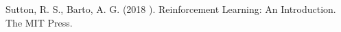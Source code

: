\documentclass[conference]{IEEEtran}
\begin{document}







\begin{thebibliography}{00}
 Sutton, R. S., Barto, A. G. (2018 ). Reinforcement Learning: An Introduction. The MIT Press.
\end{thebibliography}
\end{document}
